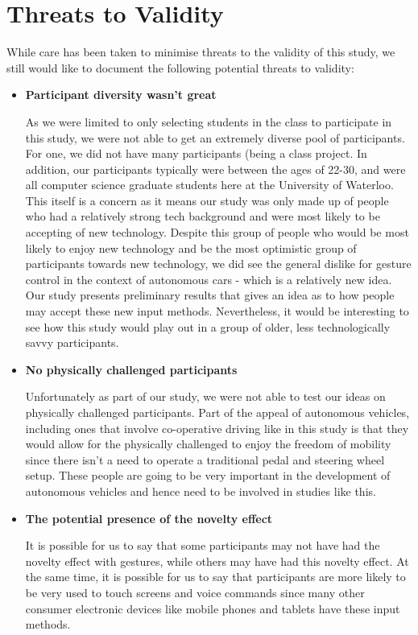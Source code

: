 \documentclass{sigchi}
\begin{document}
\section{Threats to Validity}

While care has been taken to minimise threats to the validity of this study, we still would like to document the following potential threats to validity:

\begin{itemize}
\item \textbf{Participant diversity wasn't great}

As we were limited to only selecting students in the class to participate in this study, we were not able to get an extremely diverse pool of participants. For one, we did not have many participants (being a class project. In addition, our participants typically were between the ages of 22-30, and were all computer science graduate students here at the University of Waterloo. This itself is a concern as it means our study was only made up of people who had a relatively strong tech background and were most likely to be accepting of new technology. Despite this group of people who would be most likely to enjoy new technology and be the most optimistic group of participants towards new technology, we did see the general dislike for gesture control in the context of autonomous cars - which is a relatively new idea. Our study presents preliminary results that gives an idea as to how people may accept these new input methods. Nevertheless, it would be interesting to see how this study would play out in a group of older, less technologically savvy participants.
\item \textbf{No physically challenged participants}

Unfortunately as part of our study, we were not able to test our ideas on physically challenged participants. Part of the appeal of autonomous vehicles, including ones that involve co-operative driving like in this study is that they would allow for the physically challenged to enjoy the freedom of mobility since there isn't a need to operate a traditional pedal and steering wheel setup. These people are going to be very important in the development of autonomous vehicles and hence need to be involved in studies like this. 

\item \textbf{The potential presence of the novelty effect}

It is possible for us to say that some participants may not have had the novelty effect with gestures, while others may have had this novelty effect. At the same time, it is possible for us to say that participants are more likely to be very used to touch screens and voice commands since many other consumer electronic devices like mobile phones and tablets have these input methods. 


\end{itemize}
\end{document}
